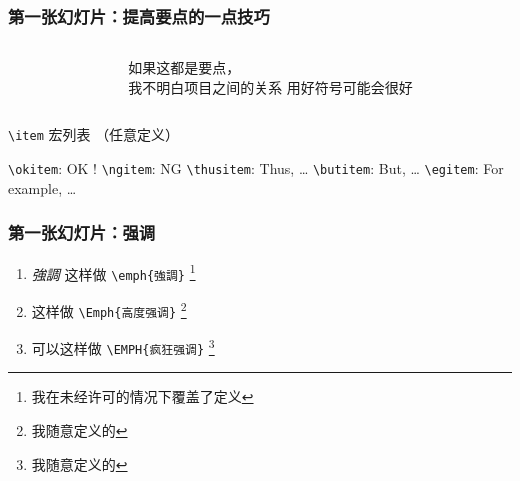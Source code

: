 \begin{frame}[fragile]
  \frametitle{第一张幻灯片：提高要点的{\normalsize 一点}技巧}
  \begin{columns}
    \begin{column}{0.54\textwidth}
      
    \end{column}
    \begin{column}{0.46\textwidth}
      \begin{itemize}
        \ngitem
        如果这都是要点，\\
        我不明白项目之间的关系
        \thusitem 用好符号可能会很好
      \end{itemize}
    \end{column}
  \end{columns}

  \begin{mybox}{\texttt{\textbackslash item} 宏列表%
        {\footnotesize （任意定义）}
    }
    \begin{itemize}
      \okitem \verb|\okitem|: OK !
      \ngitem \verb|\ngitem|: NG
      \thusitem \verb|\thusitem|: Thus, \dots
      \butitem \verb|\butitem|: But, \dots
      \egitem \verb|\egitem|: For example, \dots
    \end{itemize}
  \end{mybox}
\end{frame}

\begin{frame}[fragile]
  \frametitle{第一张幻灯片：强调}
  \begin{enumerate}
  \item
    \emph{強調} 这样做 \verb|\emph{強調}|%
    \footnote{\insertfootnotemark
    我在未经许可的情况下覆盖了定义
    }
  \item
     这样做 \verb|\Emph{高度强调}|%
    \footnote{\insertfootnotemark
    我随意定义的
    }
  \item {} 可以这样做 \verb|\EMPH{疯狂强调}|%
    \footnote{\insertfootnotemark
    我随意定义的
    }
  \end{enumerate}
  
\end{frame}


